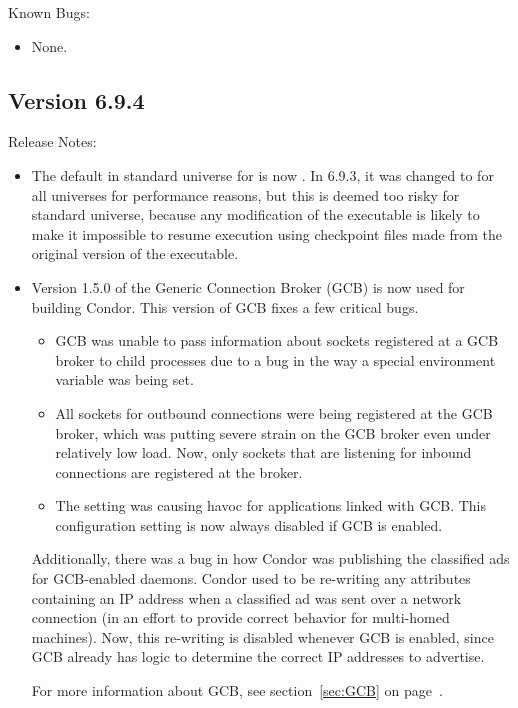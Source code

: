 \noindent Known Bugs:

\begin{itemize}

\item None.

\end{itemize}


\subsection*{\label{sec:New-6-9-4}Version 6.9.4}

\noindent Release Notes:

\begin{itemize}

\item The default in standard universe for 
is now .  In 6.9.3, it was changed to  for all
universes for performance reasons, but this is deemed too risky for
standard universe, because any modification of the executable is
likely to make it impossible to resume execution using checkpoint
files made from the original version of the executable.

\item Version 1.5.0 of the Generic Connection Broker (GCB) is
  now used for building Condor.
  This version of GCB fixes a few critical bugs.
  \begin{itemize}
    \item GCB was unable to pass information about sockets registered
      at a GCB broker to child processes due to a bug in the way a
      special environment variable was being set.
    \item All sockets for outbound connections were being registered
      at the GCB broker, which was putting severe strain on the GCB
      broker even under relatively low load.
      Now, only sockets that are listening for inbound connections are
      registered at the broker.
    \item The  setting was
      causing havoc for applications linked with GCB.
      This configuration setting is now always disabled if GCB is enabled.
  \end{itemize}

  Additionally, there was a bug in how Condor was publishing the
  classified ads for GCB-enabled daemons.
  Condor used to be re-writing any attributes containing an IP address
  when a classified ad was sent over a network connection (in an
  effort to provide correct behavior for multi-homed machines).
  Now, this re-writing is disabled whenever GCB is enabled, since GCB
  already has logic to determine the correct IP addresses to advertise.

  For more information about GCB, see section~\ref{sec:GCB} on
  page~\pageref{sec:GCB}. 

\end{itemize}


